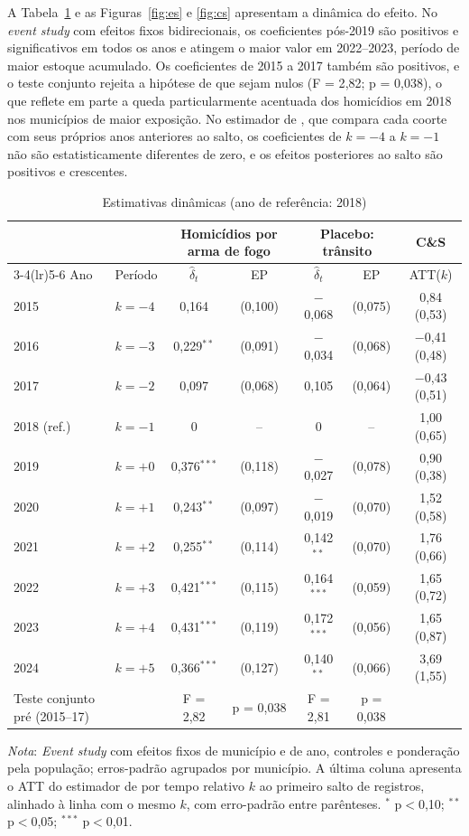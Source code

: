 \documentclass[11pt,a4paper]{article}
\newcommand{\nota}[1]{\par\vspace{2pt}\begin{minipage}{\linewidth}\footnotesize\textit{Nota}: #1\end{minipage}}
\begin{document}
A Tabela~\ref{tab:es} e as Figuras~\ref{fig:es} e \ref{fig:cs} apresentam a dinâmica do efeito. No \textit{event study} com efeitos fixos bidirecionais, os coeficientes pós-2019 são positivos e significativos em todos os anos e atingem o maior valor em 2022--2023, período de maior estoque acumulado. Os coeficientes de 2015 a 2017 também são positivos, e o teste conjunto rejeita a hipótese de que sejam nulos (F = 2{,}82; p = 0{,}038), o que reflete em parte a queda particularmente acentuada dos homicídios em 2018 nos municípios de maior exposição. No estimador de \citet{callaway2021}, que compara cada coorte com seus próprios anos anteriores ao salto, os coeficientes de $k=-4$ a $k=-1$ não são estatisticamente diferentes de zero, e os efeitos posteriores ao salto são positivos e crescentes.

\begin{table}[H]
\centering\footnotesize\setlength{\tabcolsep}{4pt}
\caption{Estimativas dinâmicas (ano de referência: 2018)}\label{tab:es}
\begin{tabular}{llccccc}
\toprule
 & & \multicolumn{2}{c}{Homicídios por arma de fogo} & \multicolumn{2}{c}{Placebo: trânsito} & C\&S \\
\cmidrule(lr){3-4}\cmidrule(lr){5-6}
Ano & Período & $\hat\delta_t$ & EP & $\hat\delta_t$ & EP & ATT($k$) \\
\midrule
2015 & $k=-4$ & 0{,}164 & (0{,}100) & $-$0{,}068 & (0{,}075) & 0{,}84 (0{,}53) \\
2016 & $k=-3$ & 0{,}229$^{**}$ & (0{,}091) & $-$0{,}034 & (0{,}068) & $-$0{,}41 (0{,}48) \\
2017 & $k=-2$ & 0{,}097 & (0{,}068) & 0{,}105 & (0{,}064) & $-$0{,}43 (0{,}51) \\
2018 (ref.) & $k=-1$ & 0 & -- & 0 & -- & 1{,}00 (0{,}65) \\
2019 & $k=+0$ & 0{,}376$^{***}$ & (0{,}118) & $-$0{,}027 & (0{,}078) & 0{,}90 (0{,}38) \\
2020 & $k=+1$ & 0{,}243$^{**}$ & (0{,}097) & $-$0{,}019 & (0{,}070) & 1{,}52 (0{,}58) \\
2021 & $k=+2$ & 0{,}255$^{**}$ & (0{,}114) & 0{,}142$^{**}$ & (0{,}070) & 1{,}76 (0{,}66) \\
2022 & $k=+3$ & 0{,}421$^{***}$ & (0{,}115) & 0{,}164$^{***}$ & (0{,}059) & 1{,}65 (0{,}72) \\
2023 & $k=+4$ & 0{,}431$^{***}$ & (0{,}119) & 0{,}172$^{***}$ & (0{,}056) & 1{,}65 (0{,}87) \\
2024 & $k=+5$ & 0{,}366$^{***}$ & (0{,}127) & 0{,}140$^{**}$ & (0{,}066) & 3{,}69 (1{,}55) \\
\midrule
Teste conjunto pré (2015--17) &  & F = 2{,}82 & p = 0{,}038 & F = 2{,}81 & p = 0{,}038 &  \\
\bottomrule
\end{tabular}
\nota{\textit{Event study} com efeitos fixos de município e de ano, controles e ponderação pela população; erros-padrão agrupados por município. A última coluna apresenta o ATT do estimador de \citet{callaway2021} por tempo relativo $k$ ao primeiro salto de registros, alinhado à linha com o mesmo $k$, com erro-padrão entre parênteses. $^{*}$ p$<$0,10; $^{**}$ p$<$0,05; $^{***}$ p$<$0,01.}
\end{table}
\end{document}
